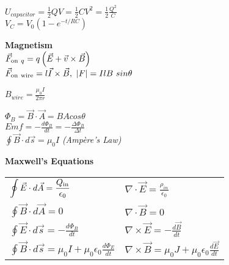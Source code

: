 \documentclass[12pt]{article}
\begin{document}
\begin{twocolumn}
\begin{flushleft}
\medskip
$\displaystyle U_{capacitor} = \frac{1}{2} Q V = \frac{1}{2} C V^2 = \frac{1}{2} \frac{Q^2}{C}$ \\
\medskip
$\displaystyle V_C = V_0(1-e^{-t/RC}) $ \\
\bigskip

{\bf Magnetism} \\
\bigskip
${\displaystyle \vec{F}_{{\rm on}\ q}=q\left(\vec{E} + \vec{v}\times\vec{B}\right)}$ \\
\medskip
$\displaystyle \vec{F}_{\rm on \ wire}=l\vec{I}\times\vec{B}, ~|F| = I l B~sin\theta $ \\
\medskip

$\displaystyle B_{wire} = \frac{\mu_0 I}{2 \pi r} $ \\
\medskip

$\displaystyle \Phi_B = \vec{B}\cdot\vec{A} = B A cos \theta  $ \\ 
\medskip
$\displaystyle Emf = - \frac{d\Phi_{B}}{dt} = -\frac{\Delta
  \Phi_B}{\Delta t} $ \\
\medskip
 ${\displaystyle \oint\vec{B}\cdot d\vec{s}=\mu_{0}I}$ {\it
   (Amp\`ere's Law)} \\ 
\bigskip

{\bf Maxwell's Equations} \\
\begin{tabular}{l|l}
$\displaystyle \oint \vec{E} \cdot d\vec{A} = \frac{Q_{\rm in}}{\epsilon_0}$  & $\nabla \cdot  \vec{E}=\frac{\rho_{in}}{\epsilon_0} $ \\
$\displaystyle \oint \vec{B} \cdot d\vec{A} = 0$  & $\nabla \cdot \vec{B}=0$\\ 
$\displaystyle \oint \vec{E} \cdot d\vec{s} = -\frac{d\Phi_B}{dt}$  & $\nabla \times \vec{E}=-\frac{d\vec{B}}{dt}$\\ 
$\displaystyle \oint \vec{B} \cdot d\vec{s} = \mu_0 I + \mu_0
\epsilon_0 \frac{d \Phi_E}{dt}$ & $\nabla \times  \vec{B}= \mu_0 J+ \mu_0 \epsilon_0  \frac{d \vec{E}}{dt} $ 
\end{tabular}


\end{flushleft}
\end{twocolumn}
\end{document}
